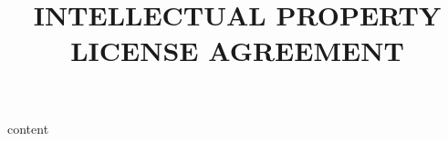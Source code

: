 \documentclass[12pt]{scrartcl}
\title{INTELLECTUAL PROPERTY\\LICENSE AGREEMENT}
\begin{document}
\maketitle
{content}
\end{document}
